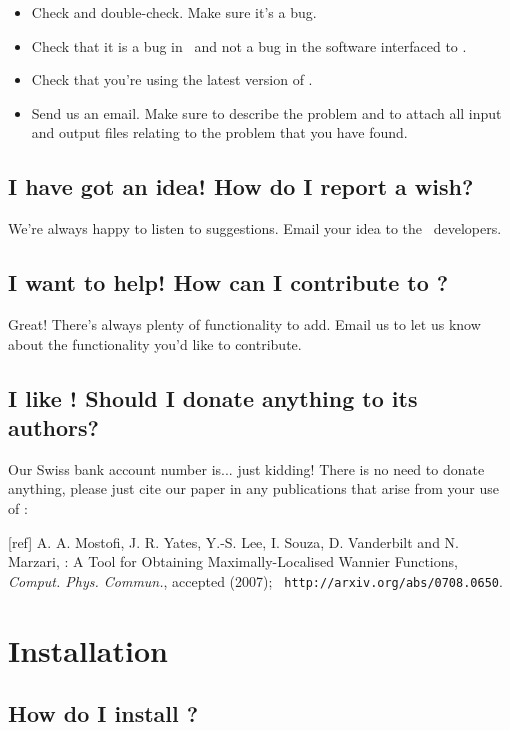 \begin{itemize}
\item Check and double-check. Make sure it's a bug.
\item Check that it is a bug in \wannier\ and not a bug in the
  software interfaced to \wannier.
\item Check that you're using the latest version of \wannier.
\item Send us an email. Make sure to
  describe the problem and to attach all input and output files
  relating to the problem that you have found.
\end{itemize}

\subsection{I have got an idea! How do I report a wish?}

We're always happy to listen to suggestions. Email your idea to the
  \wannier\ developers.

\subsection{I want to help! How can I contribute to \wannier?}

Great! There's always plenty of functionality to add. Email us 
to let us know about the functionality you'd like to contribute. 

\subsection{I like \wannier! Should I donate anything to its authors?}

Our Swiss bank account number is... just kidding! There is no need to
donate anything, please just cite our paper in any publications that
arise from your use of \wannier:

[ref] A. A. Mostofi, J. R. Yates, Y.-S. Lee, I. Souza, D. Vanderbilt
and N. Marzari, \wannier: A Tool for Obtaining Maximally-Localised
Wannier Functions, {\it Comput. Phys. Commun.}, accepted (2007); {\tt
http://arxiv.org/abs/0708.0650}.

\section{Installation}

\subsection{How do I install \wannier?\label{sec:installation}}

